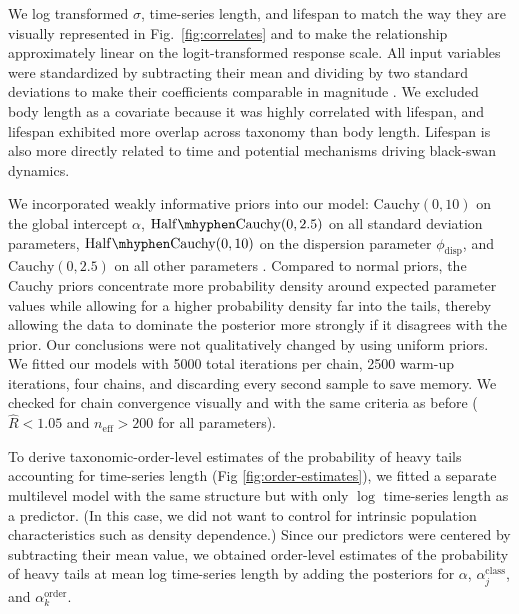We log transformed $\sigma$, time-series length, and lifespan to match the way they are visually represented in Fig.~\ref{fig:correlates} and to make the relationship approximately linear on the logit-transformed response scale. All input variables were standardized by subtracting their mean and dividing by two standard deviations to make their coefficients comparable in magnitude \citep{gelman2008c}. We excluded body length as a covariate because it was highly correlated with lifespan, and lifespan exhibited more overlap across taxonomy than body length. Lifespan is also more directly related to time and potential mechanisms driving black-swan dynamics.

We incorporated weakly informative priors into our model: $\mathrm{Cauchy}(0,
10)$ on the global intercept $\alpha$, $\mathrm{Half\mhyphen Cauchy}(0, 2.5)$ on all standard deviation parameters, $\mathrm{Half\mhyphen Cauchy}(0, 10)$ on the dispersion parameter $\phi_\mathrm{disp}$, and $\mathrm{Cauchy}(0, 2.5)$ on all other parameters \citep{gelman2006c, gelman2008d}. Compared to normal priors, the Cauchy priors concentrate more probability density around expected parameter values while allowing for a higher probability density far into the tails, thereby allowing the data to dominate the posterior more strongly if it disagrees with the prior. Our conclusions were not qualitatively changed by using uniform priors. We fitted our models with 5000 total iterations per chain, 2500 warm-up iterations, four chains, and discarding every second sample to save memory. We checked for chain convergence visually and with the same criteria as before ($\widehat{R} < 1.05$ and $n_\mathrm{eff} >200$ for all parameters).

To derive taxonomic-order-level estimates of the probability of heavy tails accounting for time-series length (Fig \ref{fig:order-estimates}), we fitted a separate multilevel model with the same structure but with only $\log$ time-series length as a predictor. (In this case, we did not want to control for intrinsic population characteristics such as density dependence.) Since our predictors were centered by subtracting their mean value, we obtained order-level estimates of the probability of heavy tails at mean log time-series length by adding the posteriors for $\alpha$, $\alpha^\mathrm{class}_j$, and $\alpha^\mathrm{order}_k$.




